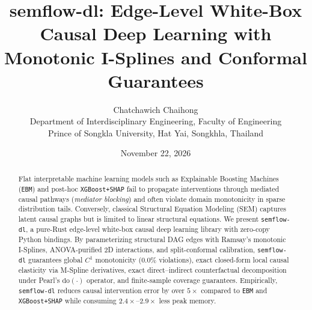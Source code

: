 \documentclass[twoside,11pt]{article}
\title{semflow-dl: Edge-Level White-Box Causal Deep Learning with Monotonic I-Splines and Conformal Guarantees}
\author{Chatchawich Chaihong \\
Department of Interdisciplinary Engineering, Faculty of Engineering \\
Prince of Songkla University, Hat Yai, Songkhla, Thailand}
\date{November 22, 2026}
\begin{document}
\maketitle

\begin{abstract}
Flat interpretable machine learning models such as Explainable Boosting Machines (\texttt{EBM}) and post-hoc \texttt{XGBoost+SHAP} fail to propagate interventions through mediated causal pathways (\emph{mediator blocking}) and often violate domain monotonicity in sparse distribution tails. Conversely, classical Structural Equation Modeling (SEM) captures latent causal graphs but is limited to linear structural equations. We present \texttt{semflow-dl}, a pure-Rust edge-level white-box causal deep learning library with zero-copy Python bindings. By parameterizing structural DAG edges with Ramsay's monotonic I-Splines, ANOVA-purified 2D interactions, and split-conformal calibration, \texttt{semflow-dl} guarantees global $C^1$ monotonicity ($0.0\%$ violations), exact closed-form local causal elasticity via M-Spline derivatives, exact direct--indirect counterfactual decomposition under Pearl's $\mathrm{do}(\cdot)$ operator, and finite-sample coverage guarantees. Empirically, \texttt{semflow-dl} reduces causal intervention error by over $5\times$ compared to \texttt{EBM} and \texttt{XGBoost+SHAP} while consuming $2.4\times\text{--}2.9\times$ less peak memory.
\end{abstract}








\end{document}
